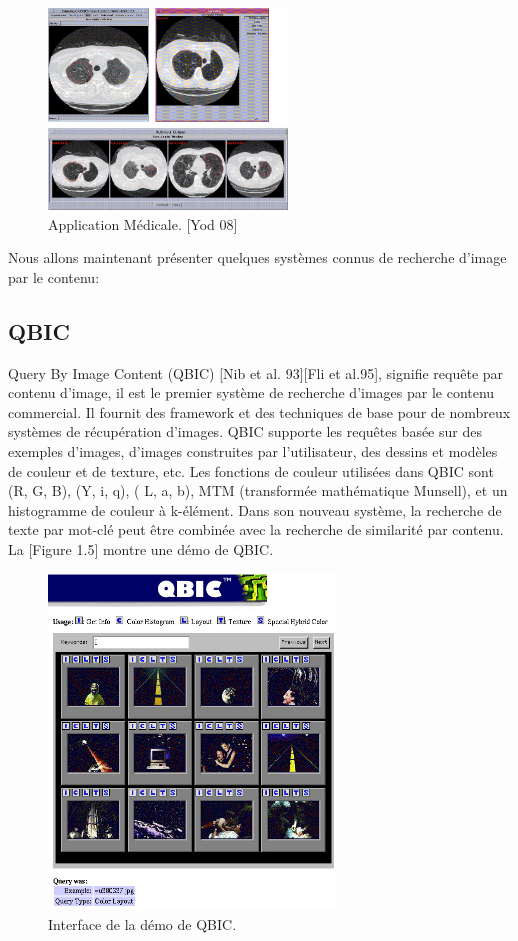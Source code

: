 \begin{figure}[H]
	\centering
		\includegraphics[width=2.5in]{Figures/cbirMedic.jpg}
	\caption[An Electron]{Application Médicale. [Yod 08]}
	\label{fig:Electron}
\end{figure}

	Nous allons maintenant présenter quelques systèmes connus de recherche d'image par le contenu:

\subsection*{QBIC}
	Query By Image Content (QBIC) [Nib et al. 93][Fli et al.95], signifie requête par contenu d'image, il est le premier système de recherche d'images par le contenu commercial. Il fournit des framework et des techniques de base pour de nombreux systèmes de récupération d'images. QBIC supporte les requêtes basée sur des exemples d'images, d'images construites par l'utilisateur, des dessins et modèles de couleur et de texture, etc. Les fonctions de couleur utilisées dans QBIC sont (R, G, B), (Y, i, q), ( L, a, b), MTM (transformée mathématique Munsell), et un histogramme de couleur à k-élément. Dans son nouveau système, la recherche de texte par mot-clé peut être combinée avec la recherche de similarité par contenu. La [Figure 1.5] montre une démo de QBIC.

\begin{figure}[H]
	\centering
		\includegraphics[width=3in]{Figures/qbic-demo.jpg}
	\caption[An Electron]{Interface de la démo de QBIC.}
	\label{fig:Electron}
\end{figure}

